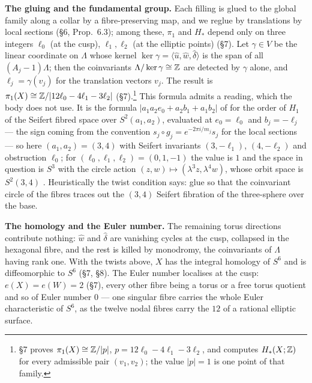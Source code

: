 \medskip
\noindent\textbf{The gluing and the fundamental group.}
Each filling is glued to the global family along a collar by a fibre-preserving map, and we reglue by translations by local sections (\S6, Prop.~6.3); among these, $\pi_1$ and $H_*$ depend only on three integers $\ell_0$ (at the cusp), $\ell_1, \ell_2$ (at the elliptic points) (\S7). Let $\gamma \in V$ be the linear coordinate on $\Lambda$ whose kernel $\ker\gamma = \langle \hat u, \hat w, \hat\delta\rangle$ is the span of all $(A_j - 1)\Lambda$; then the coinvariants $\Lambda/\ker\gamma \cong \mathbb{Z}$ are detected by $\gamma$ alone, and $\ell_j = \gamma(v_j)$ for the translation vectors $v_j$. The result is $\pi_1(X) \cong \mathbb{Z}/|12\ell_0 - 4\ell_1 - 3\ell_2|$ (\S7).\footnote{\S7 proves $\pi_1(X) \cong \mathbb{Z}/|p|$, $p = 12\ell_0 - 4\ell_1 - 3\ell_2$, and computes $H_*(X;\mathbb{Z})$ for every admissible pair $(v_1,v_2)$; the value $|p|=1$ is one point of that family.} This formula admits a reading, which the body does not use. It is the formula $|a_1 a_2 e_0 + a_2 b_1 + a_1 b_2|$ of \cite{Orl72} for the order of $H_1$ of the Seifert fibred space over $S^2(a_1,a_2)$, evaluated at $e_0 = \ell_0$ and $b_j = -\ell_j$ --- the sign coming from the convention $s_j \circ g_j = e^{-2\pi i/m_j} s_j$ for the local sections --- so here $(a_1,a_2) = (3,4)$ with Seifert invariants $(3,-\ell_1)$, $(4,-\ell_2)$ and obstruction $\ell_0$; for $(\ell_0,\ell_1,\ell_2) = (0,1,-1)$ the value is $1$ and the space in question is $S^3$ with the circle action $(z,w) \mapsto (\lambda^3 z, \lambda^4 w)$, whose orbit space is $S^2(3,4)$ \cite{Orl72}. Heuristically the twist condition says: glue so that the coinvariant circle of the fibres traces out the $(3,4)$ Seifert fibration of the three-sphere over the base.

\medskip
\noindent\textbf{The homology and the Euler number.}
The remaining torus directions contribute nothing: $\hat w$ and $\hat\delta$ are vanishing cycles at the cusp, collapsed in the hexagonal fibre, and the rest is killed by monodromy, the coinvariants of $\Lambda$ having rank one. With the twists above, $X$ has the integral homology of $S^6$ and is diffeomorphic to $S^6$ (\S7, \S8). The Euler number localises at the cusp: $e(X) = e(W) = 2$ (\S7), every other fibre being a torus or a free torus quotient and so of Euler number $0$ --- one singular fibre carries the whole Euler characteristic of $S^6$, as the twelve nodal fibres carry the $12$ of a rational elliptic surface.

